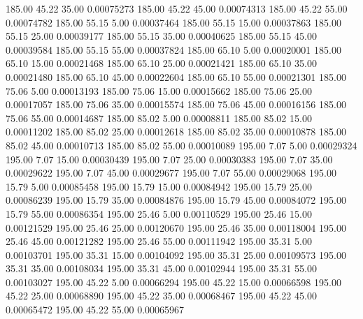     185.00     45.22     35.00     0.00075273
    185.00     45.22     45.00     0.00074313
    185.00     45.22     55.00     0.00074782
    185.00     55.15      5.00     0.00037464
    185.00     55.15     15.00     0.00037863
    185.00     55.15     25.00     0.00039177
    185.00     55.15     35.00     0.00040625
    185.00     55.15     45.00     0.00039584
    185.00     55.15     55.00     0.00037824
    185.00     65.10      5.00     0.00020001
    185.00     65.10     15.00     0.00021468
    185.00     65.10     25.00     0.00021421
    185.00     65.10     35.00     0.00021480
    185.00     65.10     45.00     0.00022604
    185.00     65.10     55.00     0.00021301
    185.00     75.06      5.00     0.00013193
    185.00     75.06     15.00     0.00015662
    185.00     75.06     25.00     0.00017057
    185.00     75.06     35.00     0.00015574
    185.00     75.06     45.00     0.00016156
    185.00     75.06     55.00     0.00014687
    185.00     85.02      5.00     0.00008811
    185.00     85.02     15.00     0.00011202
    185.00     85.02     25.00     0.00012618
    185.00     85.02     35.00     0.00010878
    185.00     85.02     45.00     0.00010713
    185.00     85.02     55.00     0.00010089
    195.00      7.07      5.00     0.00029324
    195.00      7.07     15.00     0.00030439
    195.00      7.07     25.00     0.00030383
    195.00      7.07     35.00     0.00029622
    195.00      7.07     45.00     0.00029677
    195.00      7.07     55.00     0.00029068
    195.00     15.79      5.00     0.00085458
    195.00     15.79     15.00     0.00084942
    195.00     15.79     25.00     0.00086239
    195.00     15.79     35.00     0.00084876
    195.00     15.79     45.00     0.00084072
    195.00     15.79     55.00     0.00086354
    195.00     25.46      5.00     0.00110529
    195.00     25.46     15.00     0.00121529
    195.00     25.46     25.00     0.00120670
    195.00     25.46     35.00     0.00118004
    195.00     25.46     45.00     0.00121282
    195.00     25.46     55.00     0.00111942
    195.00     35.31      5.00     0.00103701
    195.00     35.31     15.00     0.00104092
    195.00     35.31     25.00     0.00109573
    195.00     35.31     35.00     0.00108034
    195.00     35.31     45.00     0.00102944
    195.00     35.31     55.00     0.00103027
    195.00     45.22      5.00     0.00066294
    195.00     45.22     15.00     0.00066598
    195.00     45.22     25.00     0.00068890
    195.00     45.22     35.00     0.00068467
    195.00     45.22     45.00     0.00065472
    195.00     45.22     55.00     0.00065967
